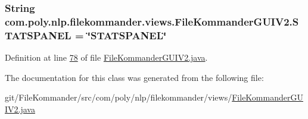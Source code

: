\hypertarget{classcom_1_1poly_1_1nlp_1_1filekommander_1_1views_1_1_file_kommander_g_u_i_v2_aff9a87dc378944cb3ab200905c962ef8}{
\subsubsection[{S\-T\-A\-T\-S\-P\-A\-N\-E\-L}]{\setlength{\rightskip}{0pt plus 5cm}String com.\-poly.\-nlp.\-filekommander.\-views.\-File\-Kommander\-G\-U\-I\-V2.\-S\-T\-A\-T\-S\-P\-A\-N\-E\-L = \char`\"{}S\-T\-A\-T\-S\-P\-A\-N\-E\-L\char`\"{}\hspace{0.3cm}{\ttfamily [private]}}}\label{classcom_1_1poly_1_1nlp_1_1filekommander_1_1views_1_1_file_kommander_g_u_i_v2_aff9a87dc378944cb3ab200905c962ef8}


Definition at line \hyperlink{L78}{78} of file \hyperlink{}{File\-Kommander\-G\-U\-I\-V2.\-java}.



The documentation for this class was generated from the following file\-:\begin{DoxyCompactItemize}
\item 
git/\-File\-Kommander/src/com/poly/nlp/filekommander/views/\hyperlink{_file_kommander_g_u_i_v2_8java}{File\-Kommander\-G\-U\-I\-V2.\-java}\end{DoxyCompactItemize}
